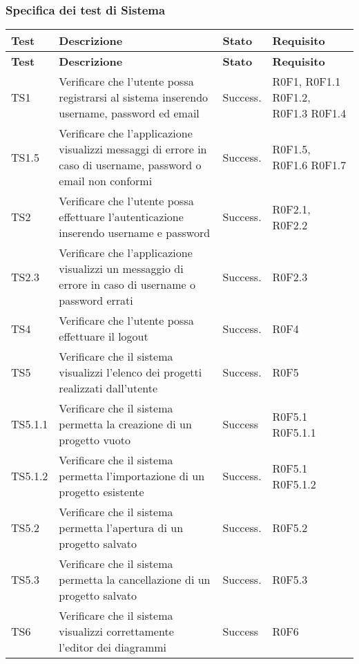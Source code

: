 \subsubsection{Specifica dei test di Sistema}
\begin{longtable}{p{2.5cm}!{\VRule[1pt]}p{6cm}!{\VRule[1pt]}p{1.5cm}!{\VRule[1pt]}p{3cm}}
\color{white} \textbf{Test} & \color{white} \textbf{Descrizione}  & \color{white} \textbf{Stato}  & \color{white} \textbf{Requisito}\\ 
\endfirsthead 
{} 
\color{white} \textbf{Test} & \color{white} \textbf{Descrizione}  & \color{white} \textbf{Stato}  & \color{white} \textbf{Requisito}\\  
\endhead 
TS1 & Verificare che l'utente possa registrarsi al sistema inserendo username, password ed email  & Success. & R0F1, R0F1.1\newline
R0F1.2, R0F1.3\newline
R0F1.4\\
TS1.5 & Verificare che l'applicazione visualizzi messaggi di errore in caso di username, password o email non conformi & Success. & R0F1.5, R0F1.6 \newline
R0F1.7\\
TS2 & Verificare che l'utente possa effettuare l'autenticazione inserendo username e password & Success. & R0F2.1, R0F2.2\\
TS2.3 & Verificare che l'applicazione visualizzi un messaggio di errore in caso di username o password errati & Success. & R0F2.3\\
TS4 & Verificare che l'utente possa effettuare il logout & Success. & R0F4\\
TS5 & Verificare che il sistema visualizzi l'elenco dei progetti realizzati dall'utente & Success. & R0F5 \\
TS5.1.1 & Verificare che il sistema permetta la creazione di un progetto vuoto & Success & R0F5.1 R0F5.1.1\\
TS5.1.2 & Verificare che il sistema permetta l'importazione di un progetto esistente & Success. & R0F5.1 R0F5.1.2\\
TS5.2 & Verificare che il sistema permetta l'apertura di un progetto salvato & Success. & R0F5.2\\
TS5.3 & Verificare che il sistema permetta la cancellazione di un progetto salvato & Success. & R0F5.3\\
TS6 & Verificare che il sistema visualizzi correttamente l'editor dei diagrammi & Success & R0F6\\

\end{longtable}
